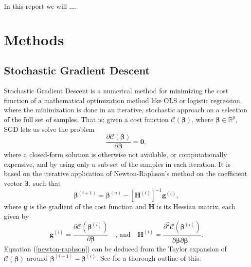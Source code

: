 \documentclass[]{article}
\begin{document}
In this report we will ....





\clearpage
\section{Methods} \label{methods}

\subsection{Stochastic Gradient Descent}
Stochastic Gradient Descent is a numerical method for minimizing the cost function of a mathematical optimization method like OLS or logistic regression, where the minimization is done in an iterative, stochastic approach on a selection of the full set of samples. That is; given a cost function $\mathcal{C}(\mathbf{\beta})$, where $\mathbf{\beta} \in \mathbb{R}^p$, SGD lets us solve the problem
\begin{equation}
	\frac{\partial \mathcal{C}(\mathbf{\beta})}{\partial \mathbf{\beta}} = \mathbf{0},
\end{equation}
where a closed-form solution is otherwise not available, or computationally expensive, and by using only a sub-set of the samples in each iteration. It is based on the iterative application of Newton-Raphson's method on the coefficient vector $\mathbf{\beta}$, such that
\begin{equation} \label{newton-raphson}
	\mathbf{\beta}^{(i+1)} = \mathbf{\beta}^{(n)} - [\mathbf{H}^{(i)}]^{-1}\mathbf{g}^{(i)},
\end{equation}
where $\mathbf{g}$ is the gradient of the cost function and $\mathbf{H}$ is its Hessian matrix, each given by
\begin{equation}
	\mathbf{g}^{(i)} = \frac{\partial \mathcal{C}(\mathbf{\beta}^{(i)})}{\partial \mathbf{\beta}} \quad \text{, and} \quad 
	\mathbf{H}^{(i)} = \frac{\partial^2 \mathcal{C}(\mathbf{\beta}^{(i)})}{\partial \mathbf{\beta} \partial \mathbf{\beta}^\intercal}.
\end{equation}
Equation (\ref{newton-raphson}) can be deduced from the Taylor expansion of $\mathcal{C}(\mathbf{\beta})$ around $\mathbf{\beta}^{(i+1)} - \mathbf{\beta}^{(i)}$. See \cite{fys-stk4155-notes} for a thorough outline of this.
\end{document}
